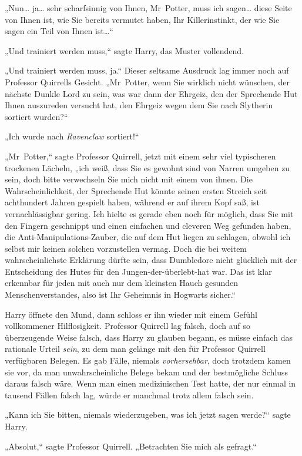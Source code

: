 {„Nun… ja… sehr scharfsinnig von Ihnen, Mr~Potter, muss ich sagen… diese Seite von Ihnen ist, wie Sie bereits vermutet haben, Ihr Killerinstinkt, der wie Sie sagen ein Teil von Ihnen ist…“

„Und trainiert werden muss,“ sagte Harry, das Muster vollendend.

„Und trainiert werden muss, ja.“ Dieser seltsame Ausdruck lag immer noch auf Professor Quirrells Gesicht. „Mr~Potter, wenn Sie wirklich nicht wünschen, der nächste Dunkle Lord zu sein, was war dann der Ehrgeiz, den der Sprechende Hut Ihnen auszureden versucht hat, den Ehrgeiz wegen dem Sie nach Slytherin sortiert wurden?“

„Ich wurde nach \emph{Ravenclaw} sortiert!“

„Mr~Potter,“ sagte Professor Quirrell, jetzt mit einem sehr viel typischeren trockenen Lächeln, „ich weiß, dass Sie es gewohnt sind von Narren umgeben zu sein, doch bitte verwechseln Sie mich nicht mit einem von ihnen. Die Wahrscheinlichkeit, der Sprechende Hut könnte seinen ersten Streich seit achthundert Jahren gespielt haben, während er auf ihrem Kopf saß, ist vernachlässigbar gering. Ich hielte es gerade eben noch für möglich, dass Sie mit den Fingern geschnippt und einen einfachen und cleveren Weg gefunden haben, die Anti-Manipulations-Zauber, die auf dem Hut liegen zu schlagen, obwohl ich selbst mir keinen solchen vorzustellen vermag. Doch die bei weitem wahrscheinlichste Erklärung dürfte sein, dass Dumbledore nicht glücklich mit der Entscheidung des Hutes für den Jungen-der-überlebt-hat war. Das ist klar erkennbar für jeden mit auch nur dem kleinsten Hauch gesunden Menschenverstandes, also ist Ihr Geheimnis in Hogwarts sicher.“

Harry öffnete den Mund, dann schloss er ihn wieder mit einem Gefühl vollkommener Hilflosigkeit. Professor Quirrell lag falsch, doch auf so überzeugende Weise falsch, dass Harry zu glauben begann, es müsse einfach das rationale Urteil \emph{sein}, zu dem man gelänge mit den für Professor Quirrell verfügbaren Belegen. Es gab Fälle, niemals \emph{vorhersehbar}, doch trotzdem kamen sie vor, da man unwahrscheinliche Belege bekam und der bestmögliche Schluss daraus falsch wäre. Wenn man einen medizinischen Test hatte, der nur einmal in tausend Fällen falsch lag, würde er manchmal trotz allem falsch sein.

„Kann ich Sie bitten, niemals wiederzugeben, was ich jetzt sagen werde?“ sagte Harry.

„Absolut,“ sagte Professor Quirrell. „Betrachten Sie mich als gefragt.“

}
